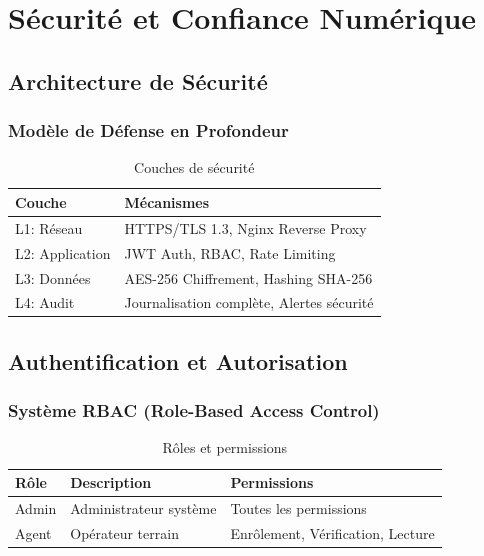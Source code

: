 \documentclass[12pt,a4paper]{report}
\begin{document}
\chapter{Sécurité et Confiance Numérique}

\section{Architecture de Sécurité}

\subsection{Modèle de Défense en Profondeur}

\begin{table}[H]
    \centering
    \caption{Couches de sécurité}
    \label{tab:security-layers}
    \begin{tabular}{|l|l|}
        \hline
        \textbf{Couche} & \textbf{Mécanismes} \\
        \hline
        L1: Réseau & HTTPS/TLS 1.3, Nginx Reverse Proxy \\
        \hline
        L2: Application & JWT Auth, RBAC, Rate Limiting \\
        \hline
        L3: Données & AES-256 Chiffrement, Hashing SHA-256 \\
        \hline
        L4: Audit & Journalisation complète, Alertes sécurité \\
        \hline
    \end{tabular}
\end{table}

\section{Authentification et Autorisation}

\subsection{Système RBAC (Role-Based Access Control)}

\begin{table}[H]
    \centering
    \caption{Rôles et permissions}
    \label{tab:rbac}
    \begin{tabular}{|l|l|p{6cm}|}
        \hline
        \textbf{Rôle} & \textbf{Description} & \textbf{Permissions} \\
        \hline
        Admin & Administrateur système & Toutes les permissions \\
        \hline
        Agent & Opérateur terrain & Enrôlement, Vérification, Lecture \\
        \hline
    \end{tabular}
\end{table}
\end{document}
